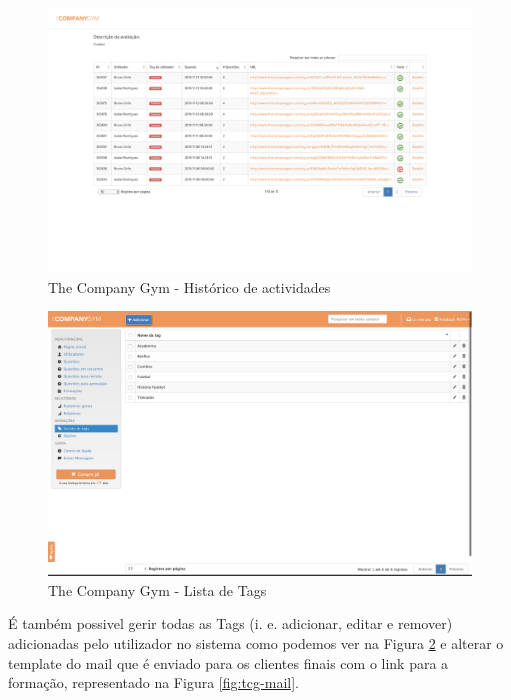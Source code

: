 \begin{figure}[ht!]
	\begin{center}
		\includegraphics[width=1\textwidth]{img/tcg/tcg-feed.png}
		\caption{The Company Gym - Histórico de actividades}
		\label{fig:tcg-feed}
	\end{center}
\end{figure}

\newpage


\begin{figure}[ht!]
	\begin{center}
		\includegraphics[width=1\textwidth]{img/tcg/tcg-tags.png}
		\caption{The Company Gym - Lista de Tags}
		\label{fig:tcg-tags}
	\end{center}
\end{figure}

É também possivel gerir todas as Tags (i. e. adicionar, editar e remover) adicionadas pelo utilizador no sistema como podemos ver na Figura \ref{fig:tcg-tags} e alterar o template do mail que é enviado para os clientes finais com o link para a formação, representado na Figura \ref{fig:tcg-mail}. 

